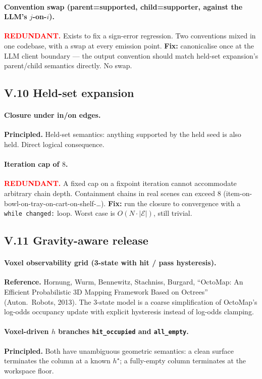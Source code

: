 \documentclass[11pt]{article}
\newcommand{\REDUNDANT}{\textcolor{red}{\textbf{REDUNDANT.}}}
\newcommand{\REFERENCE}{\textbf{Reference.}}
\newcommand{\PRINCIPLED}{\textbf{Principled.}}
\begin{document}
\paragraph{Convention swap (parent=supported, child=supporter, against
the LLM's $j$-on-$i$).}
\REDUNDANT{} Exists to fix a sign-error regression. Two conventions
mixed in one codebase, with a swap at every emission point.
\textbf{Fix:} canonicalise once at the LLM client boundary --- the
output convention should match held-set expansion's parent/child
semantics directly. No swap.

\subsection*{V.10 Held-set expansion}

\paragraph{Closure under in/on edges.}
\PRINCIPLED{} Held-set semantics: anything supported by the held seed
is also held. Direct logical consequence.

\paragraph{Iteration cap of $8$.}
\REDUNDANT{} A fixed cap on a fixpoint iteration cannot accommodate
arbitrary chain depth. Containment chains in real scenes can exceed
$8$ (item-on-bowl-on-tray-on-cart-on-shelf-\ldots).
\textbf{Fix:} run the closure to convergence with a
\texttt{while changed:} loop. Worst case is $O(N\cdot|\mathcal E|)$,
still trivial.

\subsection*{V.11 Gravity-aware release}

\paragraph{Voxel observability grid (3-state with hit / pass hysteresis).}
\REFERENCE{} Hornung, Wurm, Bennewitz, Stachniss, Burgard, ``OctoMap:
An Efficient Probabilistic 3D Mapping Framework Based on Octrees''
(Auton.~Robots, 2013). The 3-state model is a coarse simplification
of OctoMap's log-odds occupancy update with explicit hysteresis instead
of log-odds clamping.

\paragraph{Voxel-driven $h$ branches \texttt{hit\_occupied} and
\texttt{all\_empty}.}
\PRINCIPLED{} Both have unambiguous geometric semantics: a clean
surface terminates the column at a known $h^\star$; a fully-empty
column terminates at the workspace floor.
\end{document}
